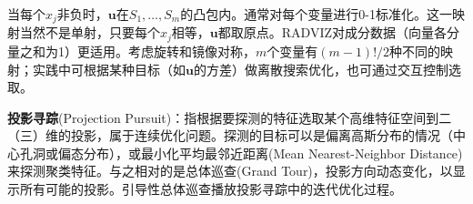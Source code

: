 \par 当每个$x_j$非负时，$\mathbf{u}$在$S_1,\dots,S_m$的凸包内。通常对每个变量进行0-1标准化。这一映射当然不是单射，只要每个$x_j$相等，$\mathbf{u}$都取原点。RADVIZ对成分数据（向量各分量之和为1）更适用。考虑旋转和镜像对称，$m$个变量有$(m-1)!/2$种不同的映射；实践中可根据某种目标（如$\mathbf{u}$的方差）做离散搜索优化，也可通过交互控制选取。

\par \textbf{投影寻踪}(Projection Pursuit)：指根据要探测的特征选取某个高维特征空间到二（三）维的投影，属于连续优化问题。探测的目标可以是偏离高斯分布的情况（中心孔洞或偏态分布），或最小化平均最邻近距离(Mean Nearest-Neighbor Distance)来探测聚类特征。与之相对的是总体巡查(Grand Tour)，投影方向动态变化，以显示所有可能的投影。引导性总体巡查播放投影寻踪中的迭代优化过程。

